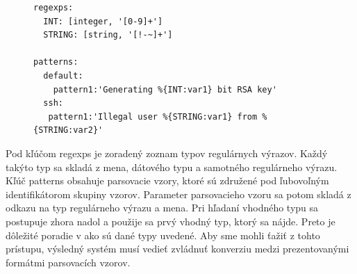 \begin{figure}[h]
\centering
\begin{minipage}{\textwidth}
\lstset{columns=flexible,breaklines=true,breakatwhitespace=true, showstringspaces=false}
\begin{lstlisting}
regexps:
  INT: [integer, '[0-9]+']
  STRING: [string, '[!-~]+']
  
patterns:
  default:
    pattern1:'Generating %{INT:var1} bit RSA key'
  ssh:
   pattern1:'Illegal user %{STRING:var1} from %{STRING:var2}'
\end{lstlisting} 		
\end{minipage} 
\end{figure}

Pod kľúčom regexps je zoradený zoznam typov regulárnych výrazov. Každý takýto typ sa skladá z mena, dátového typu a samotného regulárneho výrazu. Kľúč patterns obsahuje parsovacie vzory, ktoré sú združené pod ľubovoľným identifikátorom skupiny vzorov. Parameter parsovacieho vzoru sa potom skladá z odkazu na typ regulárneho výrazu a mena. Pri hľadaní vhodného typu sa postupuje zhora nadol a použije sa prvý vhodný typ, ktorý sa nájde. Preto je dôležité poradie v ako sú dané typy uvedené.  Aby sme mohli ťažiť z tohto prístupu, výsledný systém musí vedieť zvládnuť konverziu medzi prezentovanými formátmi parsovacích vzorov.